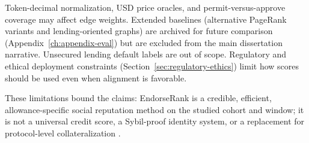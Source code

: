 Token-decimal normalization, USD price oracles, and permit-versus-approve coverage may affect edge weights. Extended baselines (alternative PageRank variants and lending-oriented graphs) are archived for future comparison (Appendix~\ref{ch:appendix-eval}) but are excluded from the main dissertation narrative. Unsecured lending default labels are out of scope. Regulatory and ethical deployment constraints (Section~\ref{sec:regulatory-ethics}) limit how scores should be used even when alignment is favorable.

These limitations bound the claims: EndorseRank is a credible, efficient, allowance-specific social reputation method on the studied cohort and window; it is not a universal credit score, a Sybil-proof identity system, or a replacement for protocol-level collateralization .
